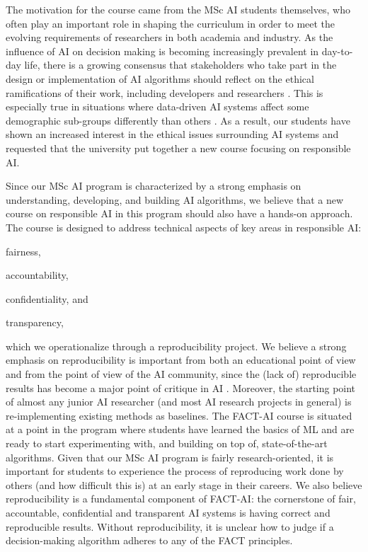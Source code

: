 \documentclass[letterpaper]{article}
\begin{document}
The motivation for the course came from the MSc AI students themselves, who often play an important role in shaping the curriculum in order to meet the evolving requirements of researchers in both academia and industry. 
As the influence of \ac{AI} on decision making is becoming increasingly prevalent in day-to-day life, there is a growing consensus that stakeholders who take part in the design or implementation of \ac{AI} algorithms should reflect on the ethical ramifications of their work, including developers and researchers \cite{campbell2021_responsible}. 
This is especially true in situations where data-driven AI systems affect some demographic sub-groups differently than others \cite{angwin2016machine, o2017ivory}.
As a result, our students have shown an increased interest in the ethical issues surrounding AI systems and requested that the university put together a new course focusing on responsible AI.

Since our MSc AI program is characterized by a strong emphasis on understanding, developing, and building AI algorithms, we believe that a new course on responsible AI in this program should also have a hands-on approach.
The course is designed to address technical aspects of key areas in responsible AI:
\begin{enumerate*}[label=(\roman*)]
\item fairness, 
\item accountability, 
\item confidentiality, and 
\item transparency, 
\end{enumerate*}
which we operationalize through a reproducibility project. 
We believe a strong emphasis on reproducibility is important from both an educational point of view and from the point of view of the AI community, since the (lack of) reproducible results has become a major point of critique in \ac{AI} \cite{hutson2018artificial}. 
Moreover, the starting point of almost any junior AI researcher (and most AI research projects in general) is re-implementing existing methods as baselines. 
The FACT-AI course is situated at a point in the program where students have learned the basics of ML and are ready to start experimenting with, and building on top of, state-of-the-art algorithms. 
Given that our MSc AI program is fairly research-oriented, it is important for students to experience the process of reproducing work done by others (and how difficult this is) at an early stage in their careers. 
We also believe reproducibility is a fundamental component of FACT-AI: the cornerstone of fair, accountable, confidential and transparent \ac{AI} systems is having correct and reproducible results. 
Without reproducibility, it is unclear how to judge if a decision-making algorithm adheres to any of the FACT principles. 
\end{document}
